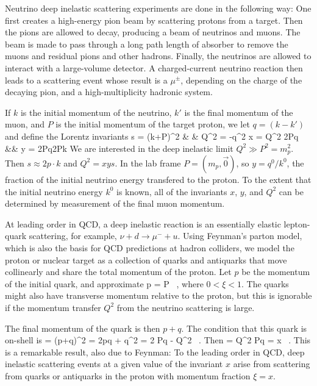 \documentclass[12pt]{article}
\begin{document}
Neutrino deep inelastic scattering experiments are done in the
following way:  One first creates a high-energy pion beam by
scattering protons from a target.  Then the pions are allowed to
decay, producing a beam of neutrinos and muons.  The beam is made to
pass through a long path length of absorber to remove the muons and
residual pions and other hadrons.   Finally, the neutrinos are allowed
to interact with a large-volume detector.
 A charged-current neutrino reaction then leads to a scattering
event  whose result is a $\mu^\pm$, depending on the
charge of the decaying pion, and a high-multiplicity hadronic system.

If $k$ is the initial momentum of the neutrino, $k'$ is the
final momentum of the muon, and $P$ is the initial momentum of the
target proton, we let $q = (k-k')$ and define the Lorentz invariants 
\beqa
    s = (k+P)^2   & \qquad&   Q^2 = -q^2 \CR
 x = {Q^2 \over 2P\cdot q} &\qquad&   y  = {2P\cdot q\over 2P\cdot k} 
\eeqan
We are interested in the deep inelastic limit $Q^2 \gg P^2 = m_p^2$.  Then $s \approx
2p\cdot k$ and $Q^2 = xy s$.    In the lab frame $P = (m_p, \vec 0)$,
so $y = q^0/k^0$, the fraction of the initial neutrino energy
transfered to the proton.   To the extent that the initial neutrino
energy $k^0$ is known, all of the invariants $x$, $y$, and $Q^2$ can be
determined by measurement of the final muon momentum.

At leading order in QCD, a deep inelastic reaction is an essentially
elastic lepton-quark scattering, for example, $\nu + d\to \mu^- + u$.
Using Feynman's parton model, which is also the basis for QCD
predictions at hadron colliders, we model the proton or nuclear target as a collection of quarks
and antiquarks that move collinearly and  share the total momentum of the proton.  Let $p$
be the momentum of the initial quark, and approximate
\beq
       p = \xi P \ , 
\eeqn
where $0 < \xi  < 1$.  The quarks might also have transverse momentum
relative to the proton, but this is ignorable if the momentum transfer
$Q^2$ from the neutrino scattering is large.     

The final momentum of the quark is then  $p + q$.   The condition that
this quark is on-shell is
 = (p+q)^2 =   2p\cdot q + q^2 =   2 \xi P\cdot q - Q^2 \ .
\eeqn
Then
\beq 
     \xi =  {Q^2  P\cdot q} = x   \ .
\eeqn
This is a remarkable result, also  due to Feynman:  To the leading order in
QCD, deep inelastic scattering events at a given value of the
invariant $x$ arise from scattering from quarks or antiquarks in the proton with
momentum fraction  $\xi = x$.
\end{document}
